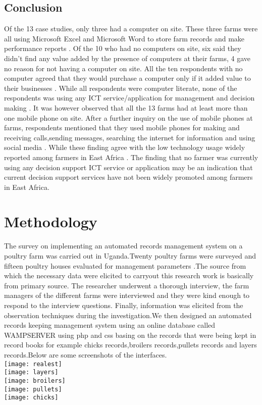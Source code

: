 \documentclass{article}
\begin{document}
\subsection{Conclusion}
Of the 13 case studies, only three  had a computer on site. These three farms were all
using Microsoft Excel and Microsoft Word to store farm records and make performance
reports \cite{r1}. Of the 10 who had no computers on site, six said they didn’t find any value added by the presence of computers at their farms, 4 gave no reason for not having a
computer on site. All the ten respondents  with no computer agreed that they would
purchase a computer only if it added value to their businesses \cite{r1}. While all respondents were computer literate, none of the respondents was using any ICT service/application for management and decision making \cite{r1}. It was however observed that all the 13 farms had at least more than one mobile phone on site. After a further inquiry on the use of mobile phones at farms, respondents mentioned that they used mobile phones for making and receiving calls,sending messages, searching the internet for information and using social media \cite{r1}. While these finding agree with the low technology usage widely reported among farmers in East Africa \cite{r3}. The finding that no farmer was currently using any decision support ICT service or application may be an indication that current decision support services have not been widely promoted among farmers in East Africa.
\section{Methodology}
The survey on implementing an automated records management system on a poultry farm was carried out in Uganda.Twenty poultry farms were surveyed and fifteen poultry houses evaluated for management parameters .The source from which the necessary data were elicited to carryout this research work is basically from primary source. The researcher underwent a thorough interview, the farm managers of the different farms were interviewed and they were kind enough to respond to the interview questions. Finally, information was elicited from the observation techniques during the investigation.We then designed an automated records keeping management system using an online database called WAMPSERVER using php and css basing on the  records that were being kept in record books for example chicks records,broilers records,pullets records and layers records.Below are some screenshots of the interfaces.\\



\texttt{[image: realest]}\\
\texttt{[image: layers]}\\
\texttt{[image: broilers]}\\
\texttt{[image: pullets]}\\
\texttt{[image: chicks]}




\end{document}
